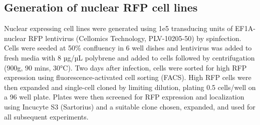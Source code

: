 \documentclass[9pt,lineno]{elife}
\begin{document}
\subsection{Generation of nuclear RFP cell lines}
Nuclear expressing cell lines were generated using 1e5 transducing units of EF1A-nuclear RFP lentivirus (Cellomics Technology, PLV-10205-50) by spinfection.
Cells were seeded at 50\% confluency in 6 well dishes and lentivirus was added to fresh media with 8 µg/µL polybrene and added to cells followed by centrifugation (900g, 90 mins, 30°C).
Two days after infection, cells were sorted for high RFP expression using fluorescence-activated cell sorting (FACS).
High RFP cells were then expanded and single-cell cloned by limiting dilution, plating 0.5 cells/well on a 96 well plate.
Plates were then screened for RFP expression and localization using Incucyte S3 (Sartorius) and a suitable clone chosen, expanded, and used for all subsequent experiments.
\end{document}
